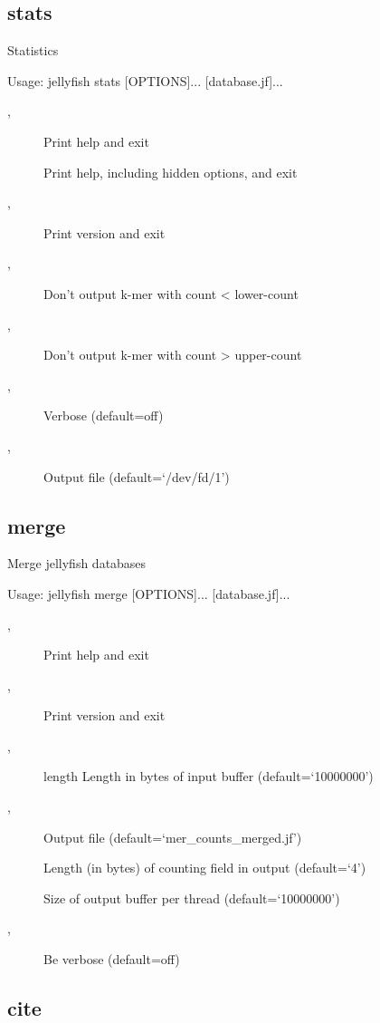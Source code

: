 \subsection{stats}

Statistics

Usage: jellyfish stats [OPTIONS]... [database.jf]...

\begin{description}
\item[,] Print help and exit
\item[] Print help, including hidden options, and exit
\item[,] Print version and exit
\item[,] Don't output k-mer with count < lower-count
\item[,] Don't output k-mer with count > upper-count
\item[,] Verbose  (default=off)
\item[,] Output file  (default=`/dev/fd/1')
\end{description}
\subsection{merge}

Merge jellyfish databases

Usage: jellyfish merge [OPTIONS]... [database.jf]...

\begin{description}
\item[,] Print help and exit
\item[,] Print version and exit
\item[,] length
Length in bytes of input buffer  
(default=`10000000')
\item[,] Output file  (default=`mer\_counts\_merged.jf')
\item[] Length (in bytes) of counting field in output  
(default=`4')
\item[] Size of output buffer per thread  
(default=`10000000')
\item[,] Be verbose  (default=off)
\end{description}
\subsection{cite}

